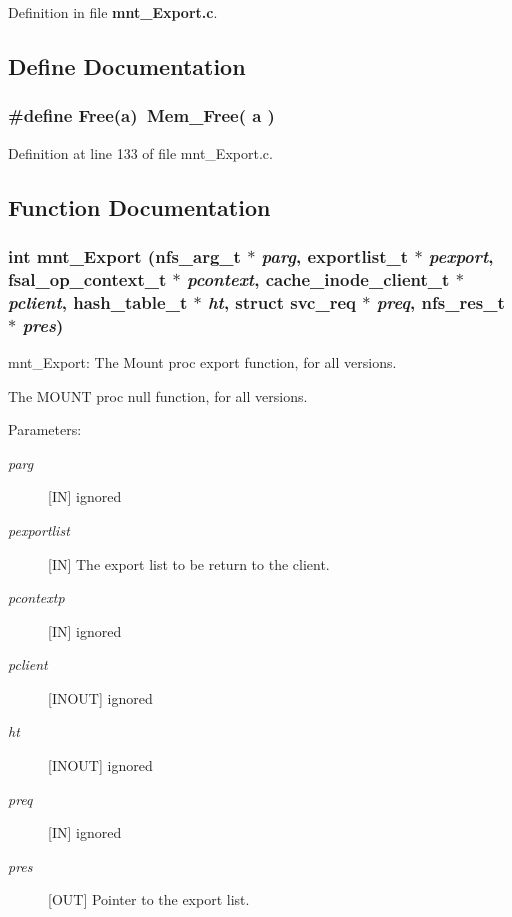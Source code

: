Definition in file {\bf mnt\_\-Export.c}.

\subsection{Define Documentation}
\subsubsection{\setlength{\rightskip}{0pt plus 5cm}\#define Free(a)\ Mem\_\-Free( a )}\label{mnt__Export_8c_a0}




Definition at line 133 of file mnt\_\-Export.c.

\subsection{Function Documentation}
\subsubsection{\setlength{\rightskip}{0pt plus 5cm}int mnt\_\-Export (nfs\_\-arg\_\-t $\ast$ {\em parg}, exportlist\_\-t $\ast$ {\em pexport}, fsal\_\-op\_\-context\_\-t $\ast$ {\em pcontext}, cache\_\-inode\_\-client\_\-t $\ast$ {\em pclient}, hash\_\-table\_\-t $\ast$ {\em ht}, struct svc\_\-req $\ast$ {\em preq}, nfs\_\-res\_\-t $\ast$ {\em pres})}\label{mnt__Export_8c_a1}


mnt\_\-Export: The Mount proc export function, for all versions.

The MOUNT proc null function, for all versions.

\begin{Desc}
\item[Parameters:]
\begin{description}
\item[{\em parg}][IN] ignored \item[{\em pexportlist}][IN] The export list to be return to the client. \item[{\em pcontextp}][IN] ignored \item[{\em pclient}][INOUT] ignored \item[{\em ht}][INOUT] ignored \item[{\em preq}][IN] ignored \item[{\em pres}][OUT] Pointer to the export list. \end{description}
\end{Desc}


